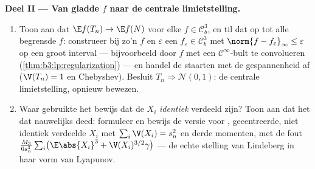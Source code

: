 \begin{problem}
\medskip
\noindent\textbf{Deel II --- Van gladde $f$ naar de centrale
limietstelling.}
\begin{enumerate}[resume]
  \item Toon aan dat $\E f(T_n) \to \E f(N)$ voor elke $f \in
        \mathcal C_b^3$, en til dat op tot alle begrensde 
        $f$: construeer bij zo'n $f$ en $\varepsilon$ een
        $f_\varepsilon \in \mathcal C^3_b$ met $\norm{f -
        f_\varepsilon}_\infty \leq \varepsilon$ op een groot
        interval --- bijvoorbeeld door $f$ met een $\mathcal
        C^\infty$-bult te convolueren
        (\cref{thm:b3:lp:regularization}) --- en handel de
        staarten met de gespannenheid af ($\V(T_n) = 1$ en
        Chebyshev). Besluit $T_n \Rightarrow \mathcal N(0, 1)$:
        de centrale limietstelling, opnieuw bewezen.
  \item Waar gebruikte het bewijs dat de $X_i$ \emph{identiek}
        verdeeld zijn? Toon aan dat het dat nauwelijks deed:
        formuleer en bewijs de versie voor ,
        gecentreerde, niet identiek verdeelde $X_i$ met
        $\sum_i\V(X_i) = s_n^2$ en derde momenten, met de fout
        $\frac{M_3}{6s_n^3}\sum_i\bigl(\E\abs{X_i}^3 +
        \V(X_i)^{3/2}\gamma\bigr)$ --- de echte stelling van
        Lindeberg in haar vorm van Lyapunov.
\end{enumerate}


\end{problem}
